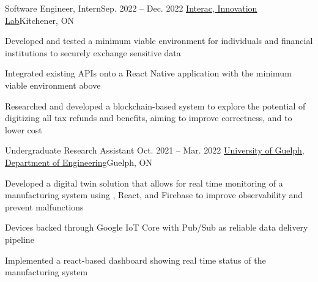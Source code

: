 \workEntry
{Software Engineer, Intern}{Sep. 2022 -- Dec. 2022}
{\href{https://www.interac.ca/en/}{\linkIcon{} Interac, Innovation Lab}}{Kitchener, ON}
\begin{ResumeItem}
    \item{Developed and tested a minimum viable environment for individuals and financial institutions to securely exchange sensitive data}
    \item{Integrated existing APIs onto a React Native application with the minimum viable environment above}
    \item{Researched and developed a blockchain-based system to explore the potential of digitizing all tax refunds and benefits, aiming to improve correctness, and to lower cost}
\end{ResumeItem}


\workEntry
{Undergraduate Research Assistant} {Oct. 2021 -- Mar. 2022}
{\href{https://www.uoguelph.ca/engineering/}{\linkIcon{} University of Guelph, Department of Engineering}}{Guelph, ON}

\begin{ResumeItem}
    \item{Developed a digital twin solution that allows for real time monitoring of a manufacturing system using \cxx, React, and Firebase to improve observability and prevent malfunctions}
    \item{Devices backed through Google IoT Core with Pub/Sub as reliable data delivery pipeline}
    \item{Implemented a react-based dashboard showing real time status of the manufacturing system}
\end{ResumeItem}





